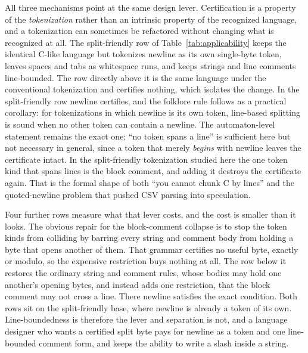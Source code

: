 \documentclass[11pt,a4paper]{article}
\theoremstyle{definition}
\theoremstyle{plain}
\begin{document}
All three mechanisms point at the same design lever. Certification is a property of the \emph{tokenization} rather than
an intrinsic property of the recognized language, and a tokenization can sometimes be refactored without changing what
is recognized at all. The split-friendly row of Table~\ref{tab:applicability} keeps the identical C-like language but
tokenizes newline as its own single-byte token, leaves spaces and tabs as whitespace runs, and keeps strings and line
comments line-bounded. The row directly above it is the same language under the conventional tokenization and certifies
nothing, which isolates the change. In the split-friendly row newline certifies, and the folklore rule follows as a
practical corollary: for tokenizations in which newline is its own token, line-based splitting is sound when no other
token can contain a newline. The automaton-level statement remains the exact one; ``no token spans a line'' is
sufficient here but not necessary in general, since a token that merely \emph{begins} with newline leaves the
certificate intact. In the split-friendly tokenization studied here the one token kind that spans lines is the block
comment, and adding it destroys the certificate again. That is the formal shape of both ``you cannot chunk C by lines''
and the quoted-newline problem that pushed CSV parsing into speculation.

Four further rows measure what that lever costs, and the cost is smaller than it looks. The obvious repair for the
block-comment collapse is to stop the token kinds from colliding by barring every string and comment body from holding a
byte that opens another of them. That grammar certifies no useful byte, exactly or modulo, so the expensive restriction
buys nothing at all. The row below it restores the ordinary string and comment rules, whose bodies may hold one
another's opening bytes, and instead adds one restriction, that the block comment may not cross a line. There newline
satisfies the exact condition. Both rows sit on the split-friendly base, where newline is already a token of its own.
Line-boundedness is therefore the lever and separation is not, and a language designer who wants a certified split byte
pays for newline as a token and one line-bounded comment form, and keeps the ability to write a slash inside a string.
\end{document}
